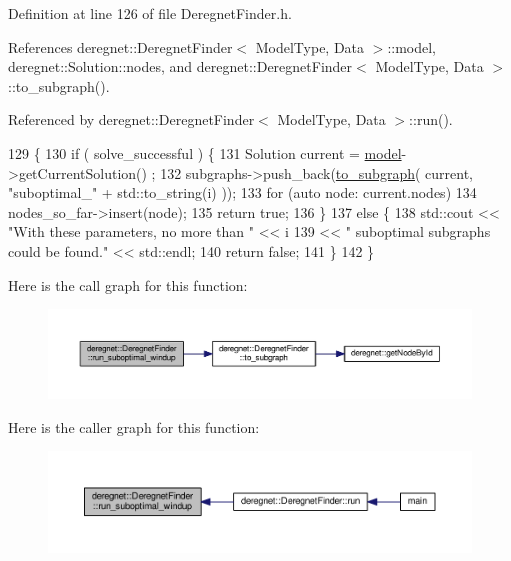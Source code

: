 Definition at line 126 of file Deregnet\+Finder.\+h.



References deregnet\+::\+Deregnet\+Finder$<$ Model\+Type, Data $>$\+::model, deregnet\+::\+Solution\+::nodes, and deregnet\+::\+Deregnet\+Finder$<$ Model\+Type, Data $>$\+::to\+\_\+subgraph().



Referenced by deregnet\+::\+Deregnet\+Finder$<$ Model\+Type, Data $>$\+::run().


\begin{DoxyCode}
129                                                                    \{
130     \textcolor{keywordflow}{if} ( solve\_successful ) \{
131         Solution current = \hyperlink{classderegnet_1_1DeregnetFinder_ad922d8e38124b4c75daac29a928fcf5b}{model}->getCurrentSolution() ;
132         subgraphs->push\_back(\hyperlink{classderegnet_1_1DeregnetFinder_a681d5e2506f9b6075ab36e742a360328}{to\_subgraph}( current, \textcolor{stringliteral}{"suboptimal\_"} + std::to\_string(i) ));
133         \textcolor{keywordflow}{for} (\textcolor{keyword}{auto} node: current.nodes)
134             nodes\_so\_far->insert(node);
135         \textcolor{keywordflow}{return} \textcolor{keyword}{true};
136     \}
137     \textcolor{keywordflow}{else} \{
138         std::cout << \textcolor{stringliteral}{"With these parameters, no more than "} << i
139              << \textcolor{stringliteral}{" suboptimal subgraphs could be found."} << std::endl;
140         \textcolor{keywordflow}{return} \textcolor{keyword}{false};
141     \}
142 \}
\end{DoxyCode}


Here is the call graph for this function\+:
\nopagebreak
\begin{figure}[H]
\begin{center}
\leavevmode
\includegraphics[width=350pt]{classderegnet_1_1DeregnetFinder_a4021d92d787877187a24dcbaf0c1bad1_cgraph}
\end{center}
\end{figure}




Here is the caller graph for this function\+:\nopagebreak
\begin{figure}[H]
\begin{center}
\leavevmode
\includegraphics[width=350pt]{classderegnet_1_1DeregnetFinder_a4021d92d787877187a24dcbaf0c1bad1_icgraph}
\end{center}
\end{figure}


